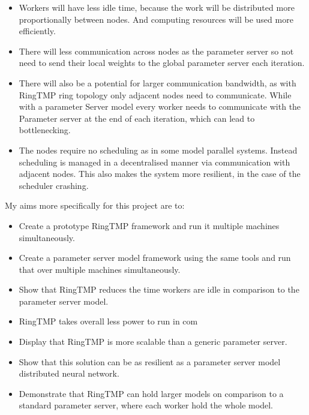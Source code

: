 \begin{itemize}
    \item Workers will have less idle time, because the work will be distributed
    more proportionally between nodes. And computing resources will be used more
    efficiently.
    \item There will less communication across nodes as the parameter server so
    not need to send their local weights to the global parameter server each
    iteration.
    \item There will also be a potential for larger communication bandwidth, as
    with RingTMP ring topology only adjacent nodes need to communicate. While
    with a parameter Server model every worker needs to communicate with the
    Parameter server at the end of each iteration, which can lead to
    bottlenecking.
    \item The nodes require no scheduling as in some model parallel systems.
    Instead scheduling is managed in a decentralised manner via communication
    with adjacent nodes. This also makes the system more resilient, in the case
    of the scheduler crashing.
\end{itemize}

My aims more specifically for this project are to:
\begin{itemize}
    \item Create a prototype RingTMP framework and run it multiple machines
    simultaneously.
    \item Create a parameter server model framework using the same tools and run
    that over multiple machines simultaneously.
    \item Show that RingTMP reduces the time workers are idle in comparison to
    the parameter server model.
    \item RingTMP takes overall less power to run in com
    \item Display that RingTMP is more scalable than a generic parameter server.
    \item Show that this solution can be as resilient as a parameter server
    model distributed neural network.
    \item Demonstrate that RingTMP can hold larger models on comparison to a
    standard parameter server, where each worker hold the whole model.
\end{itemize}


